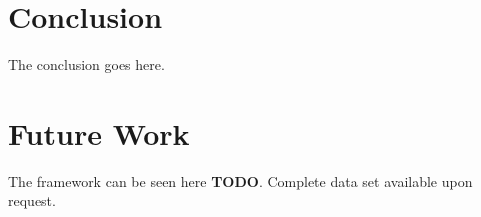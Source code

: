 \documentclass[conference]{IEEEtran}
\begin{document}
%






\section{Conclusion} \label{Sec:Conclusion}
The conclusion goes here.



\section{Future Work}

The framework can be seen here \textbf{TODO}. Complete data set available
upon request.
\end{document}
